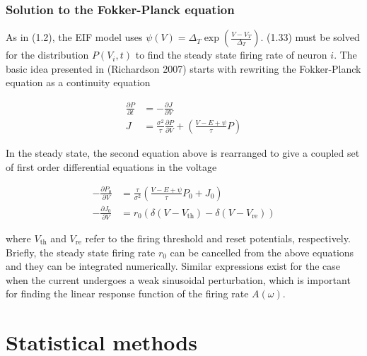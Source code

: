 \documentclass{ucetd}
\begin{document}
\subsection{Solution to the Fokker-Planck equation}

As in (1.2), the EIF model uses $\psi(V) = \Delta_{T}\exp\left(\frac{V-V_{T}}{\Delta_{T}}\right)$. (1.33) must be solved for the distribution $P(V_{i},t)$ to find the steady state firing rate of neuron $i$. The basic idea presented in (Richardson 2007) starts with rewriting the Fokker-Planck equation as a continuity equation

\begin{align*}
\frac{\partial P}{\partial t} &= -\frac{\partial J}{\partial V}\\
J &= \frac{\sigma^{2}}{\tau}\frac{\partial P}{\partial V} + \left(\frac{V-E+\psi}{\tau}P\right)
\end{align*}

In the steady state, the second equation above is rearranged to give a coupled set of first order differential equations in the voltage

\begin{align*}
-\frac{\partial P_{0}}{\partial V} &= \frac{\tau}{\sigma^{2}}\left(\frac{V-E+\psi}{\tau}P_{0} + J_{0}\right)\\
-\frac{\partial J_{0}}{\partial V} &= r_{0}\left(\delta(V-V_{\mathrm{th}}) - \delta(V-V_{\mathrm{re}})\right)
\end{align*}

where $V_{\mathrm{th}}$ and $V_{\mathrm{re}}$ refer to the firing threshold and reset potentials, respectively. Briefly, the steady state firing rate $r_{0}$ can be cancelled from the above equations and they can be integrated numerically. Similar expressions exist for the case when the current undergoes a weak sinusoidal perturbation, which is important for finding the linear response function of the firing rate $A(\omega)$. 


\chapter{Statistical methods}
\end{document}
